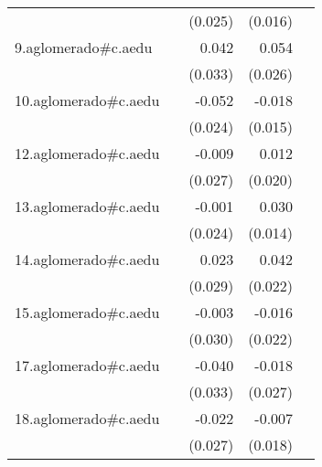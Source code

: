 {\begin{longtable}{l*{4}{D{.}{.}{-1}}}
            &                     &     (0.025)         &     (0.016)         &                     \\
\addlinespace
9.aglomerado#c.aedu&                     &       0.042         &       0.054\sym{*}  &                     \\
            &                     &     (0.033)         &     (0.026)         &                     \\
\addlinespace
10.aglomerado#c.aedu&                     &      -0.052\sym{*}  &      -0.018         &                     \\
            &                     &     (0.024)         &     (0.015)         &                     \\
\addlinespace
12.aglomerado#c.aedu&                     &      -0.009         &       0.012         &                     \\
            &                     &     (0.027)         &     (0.020)         &                     \\
\addlinespace
13.aglomerado#c.aedu&                     &      -0.001         &       0.030\sym{*}  &                     \\
            &                     &     (0.024)         &     (0.014)         &                     \\
\addlinespace
14.aglomerado#c.aedu&                     &       0.023         &       0.042         &                     \\
            &                     &     (0.029)         &     (0.022)         &                     \\
\addlinespace
15.aglomerado#c.aedu&                     &      -0.003         &      -0.016         &                     \\
            &                     &     (0.030)         &     (0.022)         &                     \\
\addlinespace
17.aglomerado#c.aedu&                     &      -0.040         &      -0.018         &                     \\
            &                     &     (0.033)         &     (0.027)         &                     \\
\addlinespace
18.aglomerado#c.aedu&                     &      -0.022         &      -0.007         &                     \\
            &                     &     (0.027)         &     (0.018)         &                     \\

\end{longtable}}
